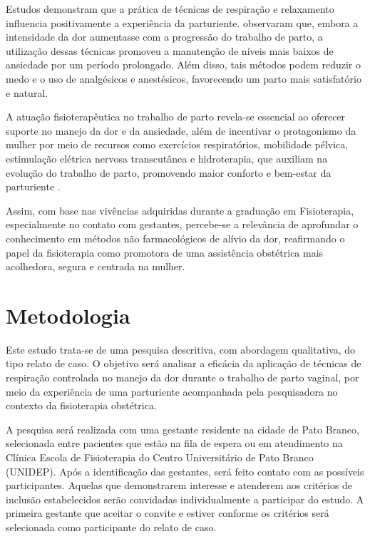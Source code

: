 \documentclass[openright]{normas-utf-tex}
\begin{document}
Estudos demonstram que a prática de técnicas de respiração e relaxamento influencia positivamente a experiência da parturiente.  observaram que, embora a intensidade da dor aumentasse com a progressão do trabalho de parto, a utilização dessas técnicas promoveu a manutenção de níveis mais baixos de ansiedade por um período prolongado. Além disso, tais métodos podem reduzir o medo e o uso de analgésicos e anestésicos, favorecendo um parto mais satisfatório e natural.

A atuação fisioterapêutica no trabalho de parto revela-se essencial ao oferecer suporte no manejo da dor e da ansiedade, além de incentivar o protagonismo da mulher por meio de recursos como exercícios respiratórios, mobilidade pélvica, estimulação elétrica nervosa transcutânea e hidroterapia, que auxiliam na evolução do trabalho de parto, promovendo maior conforto e bem-estar da parturiente \cite{sousa2021}.

Assim, com base nas vivências adquiridas durante a graduação em Fisioterapia, especialmente no contato com gestantes, percebe-se a relevância de aprofundar o conhecimento em métodos não farmacológicos de alívio da dor, reafirmando o papel da fisioterapia como promotora de uma assistência obstétrica mais acolhedora, segura e centrada na mulher.

\chapter{Metodologia}
\label{chap:metodologia}

Este estudo trata-se de uma pesquisa descritiva, com abordagem qualitativa, do tipo relato de caso. O objetivo será analisar a eficácia da aplicação de técnicas de respiração controlada no manejo da dor durante o trabalho de parto vaginal, por meio da experiência de uma parturiente acompanhada pela pesquisadora no contexto da fisioterapia obstétrica.

A pesquisa será realizada com uma gestante residente na cidade de Pato Branco, selecionada entre pacientes que estão na fila de espera ou em atendimento na Clínica Escola de Fisioterapia do Centro Universitário de Pato Branco (UNIDEP). Após a identificação das gestantes, será feito contato com as possíveis participantes. Aquelas que demonstrarem interesse e atenderem aos critérios de inclusão estabelecidos serão convidadas individualmente a participar do estudo. A primeira gestante que aceitar o convite e estiver conforme os critérios será selecionada como participante do relato de caso.
\end{document}
